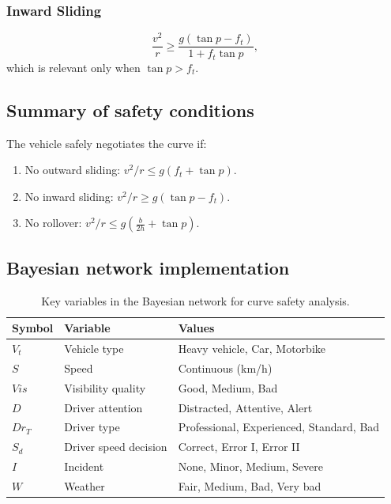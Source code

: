 \subsubsection*{Inward Sliding}
\begin{equation}
\frac{v^2}{r} \geq \frac{g(\tan p - f_t)}{1+f_t\tan p},
\label{eq:inward_exact}
\end{equation}
which is relevant only when $\tan p > f_t$.

\subsection{Summary of safety conditions}
The vehicle safely negotiates the curve if:
\begin{enumerate}
\item No outward sliding: $v^2/r \leq g(f_t+\tan p)$.
\item No inward sliding: $v^2/r \geq g(\tan p - f_t)$.
\item No rollover: $v^2/r \leq g\!\left(\tfrac{b}{2h}+\tan p\right)$.
\end{enumerate}

\subsection{Bayesian network implementation}

\begin{table}[H]
\centering
\caption{Key variables in the Bayesian network for curve safety analysis.}
\label{tab:bayesian_variables}
\begin{tabular}{llp{7cm}}
\hline
\textbf{Symbol} & \textbf{Variable} & \textbf{Values}\\\hline
$V_t$ & Vehicle type & Heavy vehicle, Car, Motorbike\\
$S$   & Speed & Continuous (km/h)\\
$Vis$ & Visibility quality & Good, Medium, Bad\\
$D$   & Driver attention & Distracted, Attentive, Alert\\
$Dr_T$& Driver type & Professional, Experienced, Standard, Bad\\
$S_d$ & Driver speed decision & Correct, Error I, Error II\\
$I$   & Incident & None, Minor, Medium, Severe\\
$W$   & Weather & Fair, Medium, Bad, Very bad\\\hline
\end{tabular}
\end{table}

